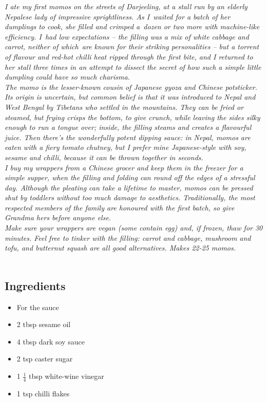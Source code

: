 \documentclass{book}
\begin{document}
\emph{I ate my first momos on the streets of Darjeeling, at a stall run by an elderly Nepalese lady of impressive sprightliness. As I waited for a batch of her dumplings to cook, she filled and crimped a dozen or two more with machine-like efficiency. I had low expectations – the filling was a mix of white cabbage and carrot, neither of which are known for their striking personalities – but a torrent of flavour and red-hot chilli heat ripped through the first bite, and I returned to her stall three times in an attempt to dissect the secret of how such a simple little dumpling could have so much charisma.\\ 
The momo is the lesser-known cousin of Japanese gyoza and Chinese potsticker. Its origin is uncertain, but common belief is that it was introduced to Nepal and West Bengal by Tibetans who settled in the mountains. They can be fried or steamed, but frying crisps the bottom, to give crunch, while leaving the sides silky enough to run a tongue over; inside, the filling steams and creates a flavourful juice. Then there’s the wonderfully potent dipping sauce: in Nepal, momos are eaten with a fiery tomato chutney, but I prefer mine Japanese-style with soy, sesame and chilli, because it can be thrown together in seconds.\\ 
I buy my wrappers from a Chinese grocer and keep them in the freezer for a simple supper, when the filling and folding can round off the edges of a stressful day. Although the pleating can take a lifetime to master, momos can be pressed shut by toddlers without too much damage to aesthetics. Traditionally, the most respected members of the family are honoured with the first batch, so give Grandma hers before anyone else.\\ 
Make sure your wrappers are vegan (some contain egg) and, if frozen, thaw for 30 minutes. Feel free to tinker with the filling: carrot and cabbage, mushroom and tofu, and butternut squash are all good alternatives. Makes 22-25 momos.}\\\\ 
\subsection*{Ingredients}
\begin{itemize}
\item For the sauce
\item 2 tbsp sesame oil
\item 4 tbsp dark soy sauce
\item 2 tsp caster sugar
\item 1 $\frac{1}{4}$ tbsp white-wine vinegar
\item 1 tsp chilli flakes
\end{itemize}
\end{document}
